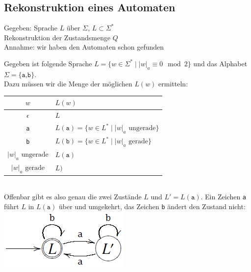 \documentclass[a4paper]{article}
\begin{document}
\subsection{Rekonstruktion eines Automaten}
	Gegeben: Sprache $L$ über $\Sigma$, $L \subset \Sigma^*$ \\
	Rekonstruktion der Zustandsmenge $Q$ \\
	Annahme: wir haben den Automaten schon gefunden
	
	\begin{falgo}[Beispiel]
		Gegeben ist folgende Sprache $L = \{w \in \Sigma^* \mid |w|_a \equiv 0 \mod 2\}$ und das Alphabet $\Sigma = \{\texttt{a,b}\}$. \\
		Dazu müssen wir die Menge der möglichen $L(w)$ ermitteln: \\
		\begin{tabular}{|c|l|}
			\hline
			$w$ & $L(w)$ \\ \hline
			$\epsilon$ & $L$ \\
			\texttt{a} & $L(\texttt{a}) = \{w \in L^* \mid |w|_a \text{ ungerade}\}$ \\
			\texttt{b} & $L(\texttt{b}) = \{w \in L^* \mid |w|_a \text{ gerade}\}$ \\
			$|w|_a \text{ ungerade}$ & $L(\texttt{a})$ \\
			$|w|_a \text{ gerade}$ & $L)$ \\ \hline
		\end{tabular} \\
		Offenbar gibt es also genau die zwei Zustände $L$ und $L' = L(\texttt{a})$. Ein Zeichen \texttt{a} führt $L$ in $L(\texttt{a})$ über und umgekehrt, das Zeichen \texttt{b} ändert den Zustand nicht: \\
		\includegraphics[scale=0.6]{rekonstruktion.png}
	\end{falgo}	
	
\end{document}
